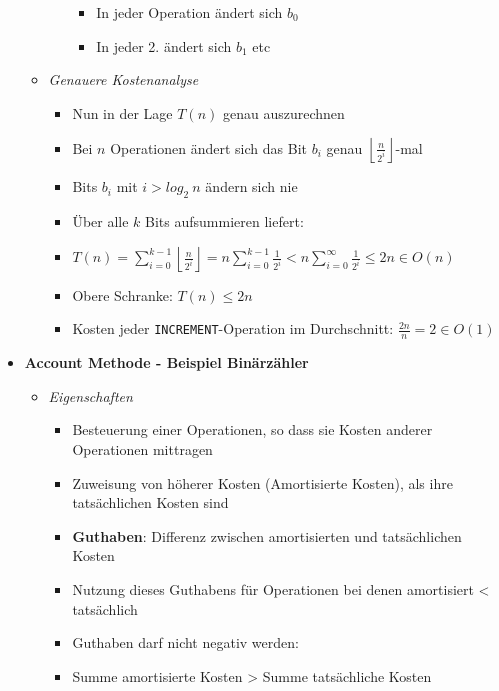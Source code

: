 \begin{itemize}
\begin{itemize}
\begin{itemize}
\begin{minipage}{0.5\textwidth}
\begin{itemize}
                                    \item In jeder Operation ändert sich $b_0$
                                    \item In jeder 2. ändert sich $b_1$ etc
                                \end{itemize}
                            \end{minipage}
                    \end{itemize}
                \item \textit{Genauere Kostenanalyse}
                    \begin{itemize}
                        \item Nun in der Lage $T(n)$ genau auszurechnen
                        \item Bei $n$ Operationen ändert sich das Bit $b_i$ genau $\left \lfloor \frac{n}{2^i} \right \rfloor$-mal
                        \item Bits $b_i$ mit $i > log_2~n$ ändern sich nie
                        \item Über alle $k$ Bits aufsummieren liefert: 
                        \item[] $T(n)= \sum^{k-1}_{i=0} \left \lfloor \frac{n}{2^i} \right \rfloor = n \sum^{k-1}_{i=0} \frac{1}{2^i} 
                                < n \sum^{\infty}_{i=0} \frac{1}{2^i} \leq 2n \in O(n)$
                        \item Obere Schranke: $T(n) \leq 2n$
                        \item Kosten jeder \texttt{INCREMENT}-Operation im Durchschnitt: $\frac{2n}{n} = 2 \in O(1)$
                                
                    \end{itemize}
            \end{itemize}

\pagebreak

        \item \textbf{Account Methode - Beispiel Binärzähler}
            \begin{itemize}
                \item \textit{Eigenschaften}
                    \begin{itemize}
                        \item Besteuerung einer Operationen, so dass sie Kosten anderer Operationen mittragen
                        \item Zuweisung von höherer Kosten (Amortisierte Kosten), als ihre tatsächlichen Kosten sind
                        \item \textbf{Guthaben}: Differenz zwischen amortisierten und tatsächlichen Kosten
                        \item Nutzung dieses Guthabens für Operationen bei denen amortisiert < tatsächlich
                        \item Guthaben darf nicht negativ werden:
                        \item[] Summe amortisierte Kosten > Summe tatsächliche Kosten
                    \end{itemize}


\end{itemize}
\end{itemize}
